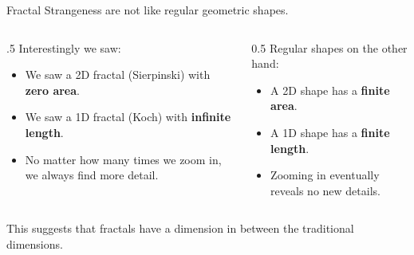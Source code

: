 \begin{frame}{Fractal Strangeness}
  \small
   are not like regular geometric shapes.
  \vspace{0.5cm}
  \begin{columns}
    \begin{column}{.5\textwidth}
      Interestingly we saw:
      \begin{itemize}
        \item We saw a 2D fractal (Sierpinski) with \textbf{zero area}.
        \item We saw a 1D fractal (Koch) with \textbf{infinite length}.
        \item No matter how many times we zoom in, we always find more detail.
      \end{itemize}
    \end{column}
    \begin{column}{0.5\textwidth}
      Regular shapes on the other hand:
      \begin{itemize}
        \item A 2D shape has a \textbf{finite area}.
        \item A 1D shape has a \textbf{finite length}.
        \item Zooming in eventually reveals no new details.
      \end{itemize}
    \end{column}
  \end{columns}
  \pause
  \vspace{0.5cm}
  This suggests that fractals have a dimension in between the traditional dimensions.
\end{frame}

